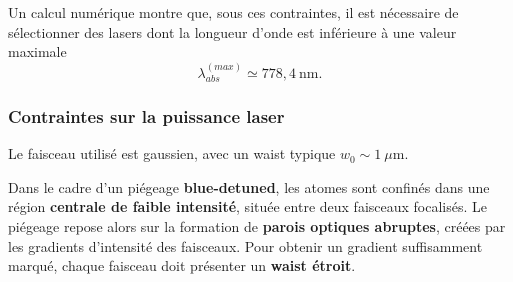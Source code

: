 Un calcul numérique montre que, sous ces contraintes, il est nécessaire de sélectionner des lasers dont la longueur d’onde est inférieure à une valeur maximale 
\[
\lambda^{(max)}_{abs} \simeq  778{,}4~\text{nm}.
\]



\subsubsection*{Contraintes sur la puissance laser}

Le faisceau utilisé est gaussien, avec un waist typique $w_0 \sim 1~\mu\text{m}$. %


Dans le cadre d’un piégeage \textbf{blue-detuned}, les atomes sont confinés dans une région \textbf{centrale de faible intensité}, située entre deux faisceaux focalisés. Le piégeage repose alors sur la formation de \textbf{parois optiques abruptes}, créées par les gradients d’intensité des faisceaux. Pour obtenir un gradient suffisamment marqué, chaque faisceau doit présenter un \textbf{waist étroit}.\\

